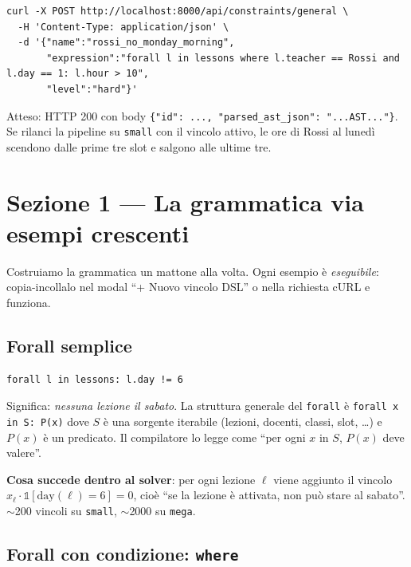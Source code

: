 \begin{esempiobox}[title=Provalo subito]
\begin{lstlisting}[style=shell]
curl -X POST http://localhost:8000/api/constraints/general \
  -H 'Content-Type: application/json' \
  -d '{"name":"rossi_no_monday_morning",
       "expression":"forall l in lessons where l.teacher == Rossi and l.day == 1: l.hour > 10",
       "level":"hard"}'
\end{lstlisting}
Atteso: HTTP 200 con body
\texttt{\{"id": ..., "parsed\_ast\_json": "...AST..."\}}.
Se rilanci la pipeline su \texttt{small} con il vincolo attivo,
le ore di Rossi al luned\`i scendono dalle prime tre slot e
salgono alle ultime tre.
\end{esempiobox}

\section{Sezione 1 --- La grammatica via esempi crescenti}
\label{sec:dsl-grammatica-esempi}

Costruiamo la grammatica un mattone alla volta. Ogni esempio
\`e \emph{eseguibile}: copia-incollalo nel modal ``+ Nuovo
vincolo DSL'' o nella richiesta cURL e funziona.

\subsection{Forall semplice}

\begin{lstlisting}[basicstyle=\ttfamily\small]
forall l in lessons: l.day != 6
\end{lstlisting}

Significa: \emph{nessuna lezione il sabato}. La struttura
generale del \texttt{forall} \`e
\texttt{forall x in S: P(x)} dove $S$ \`e una sorgente
iterabile (lezioni, docenti, classi, slot, \dots) e $P(x)$ \`e
un predicato. Il compilatore lo legge come ``per ogni $x$ in
$S$, $P(x)$ deve valere''.

\textbf{Cosa succede dentro al solver}: per ogni lezione $\ell$
viene aggiunto il vincolo
$x_{\ell} \cdot \mathbb{1}[\text{day}(\ell)=6] = 0$, cio\`e
``se la lezione \`e attivata, non pu\`o stare al sabato''.
$\sim$200 vincoli su \texttt{small}, $\sim$2000 su
\texttt{mega}.

\subsection{Forall con condizione: \texttt{where}}

